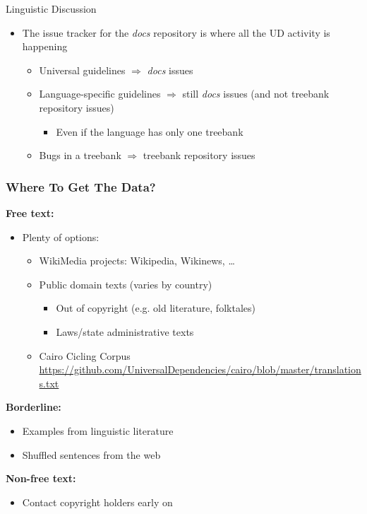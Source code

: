 \documentclass[10pt, compress, aspectratio=169]{beamer}
\begin{document}
\begin{frame}{Linguistic Discussion}
  \begin{itemize}
    \item The issue tracker for the \emph{docs} repository is where all the
        UD activity is happening
      \begin{itemize}
        \item Universal guidelines $\Rightarrow$ \emph{docs} issues
        \item Language-specific guidelines $\Rightarrow$ \alert{still
            \emph{docs} issues} (and not treebank repository issues)
          \begin{itemize}
            \item Even if the language has only one treebank
          \end{itemize}
        \item Bugs in a treebank $\Rightarrow$ treebank repository issues
      \end{itemize}
  \end{itemize}
\end{frame}


\begin{frame}
  \frametitle{Where To Get The Data?}
  \textbf{Free text:}
  \begin{itemize}
    \item Plenty of options:
    \begin{itemize}
      \item WikiMedia projects: Wikipedia, Wikinews, \ldots
      \item Public domain texts (varies by country)
      \begin{itemize}
        \item Out of copyright (e.g. old literature, folktales)
        \item Laws/state administrative texts
      \end{itemize}
      \item \alert{Cairo Cicling Corpus}
          \url{https://github.com/UniversalDependencies/cairo/blob/master/translations.txt}
    \end{itemize}
  \end{itemize}
  \textbf{Borderline:}
  \begin{itemize}
    \item Examples from linguistic literature
    \item Shuffled sentences from the web
  \end{itemize}
  \textbf{Non-free text:}
  \begin{itemize}
    \item Contact copyright holders early on
  \end{itemize}
\end{frame}
\end{document}
